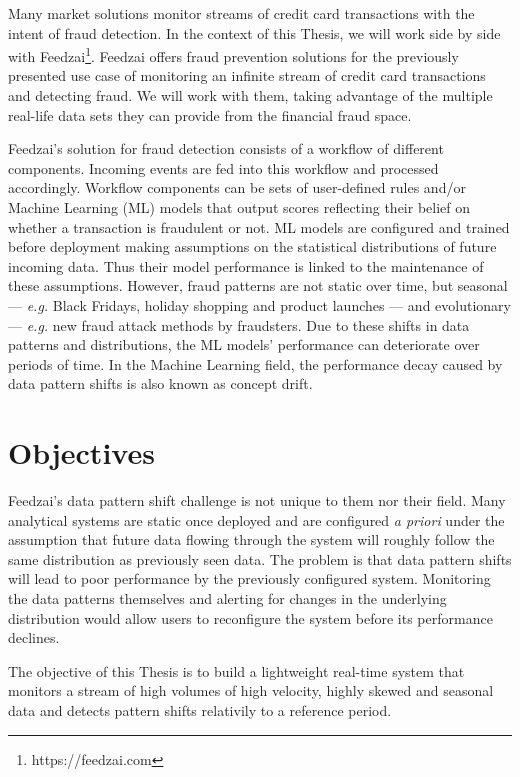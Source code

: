 Many market solutions monitor streams of credit card transactions with the intent of fraud detection. In the context of this Thesis, we will work side by side with Feedzai\footnote{https://feedzai.com}. Feedzai offers fraud prevention solutions for the previously presented use case of monitoring an infinite stream of credit card transactions and detecting fraud. We will work with them, taking advantage of the multiple real-life data sets they can provide from the financial fraud space. 

Feedzai's solution for fraud detection consists of a workflow of different components. Incoming events are fed into this workflow and processed accordingly. Workflow components can be sets of user-defined rules and/or Machine Learning (ML) models that output scores reflecting their belief on whether a transaction is fraudulent or not. ML models are configured and trained before deployment making assumptions on the statistical distributions of future incoming data. Thus their model performance is linked to the maintenance of these assumptions. However, fraud patterns are not static over time, but seasonal --- \textit{e.g.} Black Fridays, holiday shopping and product launches --- and evolutionary --- \textit{e.g.} new fraud attack methods by fraudsters. Due to these shifts in data patterns and distributions, the ML models' performance can deteriorate over periods of time. In the Machine Learning field, the performance decay caused by data pattern shifts is also known as concept drift.

\section{Objectives} \label{sec:objectives}
Feedzai's data pattern shift challenge is not unique to them nor their field. Many analytical systems are static once deployed and are configured \textit{a priori} under the assumption that future data flowing through the system will roughly follow the same distribution as previously seen data.
The problem is that data pattern shifts will lead to poor performance by the previously configured system. Monitoring the data patterns themselves and alerting for changes in the underlying distribution would allow users to reconfigure the system before its performance declines.

The objective of this Thesis is to build a lightweight real-time system that monitors a stream of high volumes of high velocity, highly skewed and seasonal data and detects pattern shifts relativily to a reference period.

